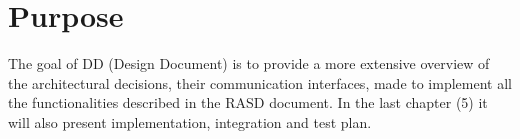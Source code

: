 \section{Purpose}
The goal of DD (Design Document) is to provide a more extensive overview of the architectural decisions, their communication interfaces, made to implement all the functionalities described in the RASD document.
In the last chapter (5) it will also present implementation, integration and test plan.